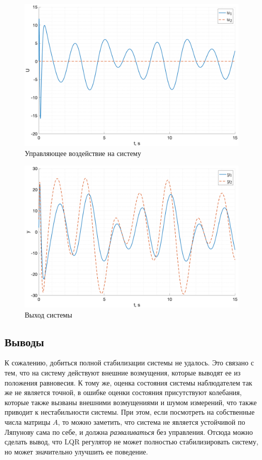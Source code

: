 \begin{figure}[ht!]
    \centering
    \includegraphics[width=\textwidth]{media/plots/lqr_task3/u_1.png}
    \caption{Управляющее воздействие на систему}
    \label{fig:lqg_u}
\end{figure}
\begin{figure}[ht!]
    \centering
    \includegraphics[width=\textwidth]{media/plots/lqr_task3/y_1.png}
    \caption{Выход системы}
    \label{fig:lqg_y}
\end{figure}
\FloatBarrier
\subsection{Выводы}
К сожалению, добиться полной стабилизации системы не удалось. Это связано с тем, 
что на систему действуют внешние возмущения, которые выводят ее из положения равновесия. 
К тому же, оценка состояния системы наблюдателем так же не является точной, в ошибке 
оценки состояния присутствуют колебания, которые также вызваны внешними возмущениями и 
шумом измерений, что также приводит к нестабильности системы. При этом, если посмотреть на 
собственные числа матрицы $A$, то можно заметить, что система не является устойчивой по Ляпунову
сама по себе, и должна \textit{разваливаться} без управления. Отсюда можно сделать вывод, что 
LQR регулятор не может полностью стабилизировать систему, но может значительно улучшить ее поведение. 